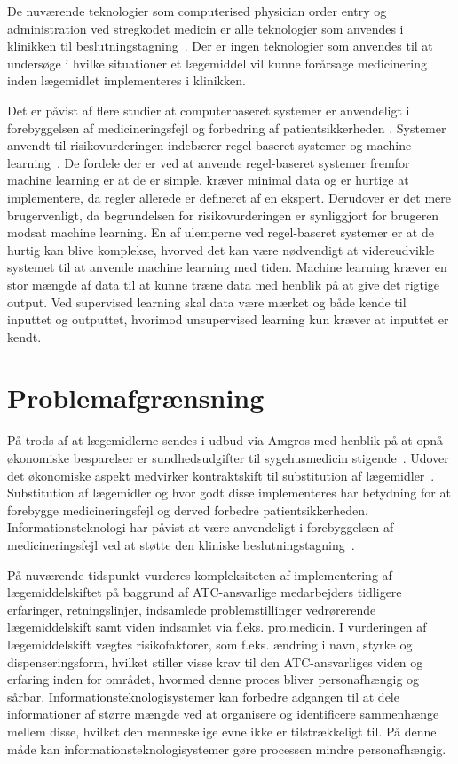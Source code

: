 De nuværende teknologier som computerised physician order entry og administration ved stregkodet medicin er alle teknologier som anvendes i klinikken til beslutningstagning~\citep{Agrawal2009, Bates2000a, Kaushal2002, Stenner2010, Fischer2008, Simpson2008}. Der er ingen teknologier som anvendes til at undersøge i hvilke situationer et lægemiddel vil kunne forårsage medicinering inden lægemidlet implementeres i klinikken.

Det er påvist af flere studier at computerbaseret systemer er anvendeligt i forebyggelsen af medicineringsfejl og forbedring af patientsikkerheden \citep{Agrawal2009, Masys2006}. Systemer anvendt til risikovurderingen indebærer regel-baseret systemer og machine learning~\citep{Geissert2018}. 
De fordele der er ved at anvende regel-baseret systemer fremfor machine learning er at de er simple, kræver minimal data og er hurtige at implementere, da regler allerede er defineret af en ekspert. Derudover er det mere brugervenligt, da begrundelsen  for risikovurderingen er synliggjort for brugeren modsat machine learning. En af ulemperne ved regel-baseret systemer er at de hurtig kan  blive komplekse, hvorved det kan være nødvendigt at videreudvikle systemet til at anvende machine learning med tiden. Machine learning kræver en stor mængde af data til at kunne træne data med henblik på at give det rigtige output. Ved supervised learning skal data være mærket og både kende til inputtet og outputtet, hvorimod unsupervised learning kun kræver at inputtet er kendt. 

\section{Problemafgrænsning}
På trods af at lægemidlerne sendes i udbud via Amgros med henblik på at opnå økonomiske besparelser er sundhedsudgifter til sygehusmedicin stigende~\citep{Sundhed2016,Sygehusapoteket2017}. Udover det økonomiske aspekt medvirker kontraktskift til substitution af lægemidler~\citep{DanskSelskabforPatientsikkerhed2009}. Substitution af lægemidler og hvor godt disse implementeres har betydning for at forebygge medicineringsfejl og derved forbedre patientsikkerheden. Informationsteknologi har påvist at være anvendeligt i forebyggelsen af medicineringsfejl ved at støtte den kliniske beslutningstagning~\citep{Agrawal2009, Anderson2002}. 

På nuværende tidspunkt vurderes kompleksiteten af implementering af lægemiddelskiftet på baggrund af ATC-ansvarlige medarbejders tidligere erfaringer, retningslinjer, indsamlede problemstillinger vedrørerende lægemiddelskift samt viden indsamlet via f.eks. pro.medicin. I vurderingen af lægemiddelskift vægtes risikofaktorer, som f.eks. ændring i navn, styrke og dispenseringsform, hvilket stiller visse krav til den ATC-ansvarliges viden og erfaring inden for området, hvormed denne proces bliver personafhængig og sårbar. Informationsteknologisystemer kan forbedre adgangen til at dele informationer af større mængde ved at organisere og identificere sammenhænge mellem disse, hvilket den menneskelige evne ikke er tilstrækkeligt til. På denne måde kan informationsteknologisystemer gøre processen mindre personafhængig. 

